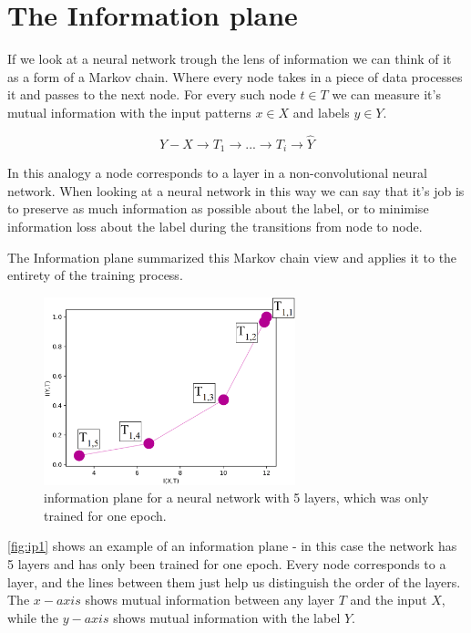 \documentclass[dissertation.tex]{subfiles}
\begin{document}
\section{The Information plane}

If we look at a neural network trough the lens of information we can think of it
as a form of a Markov chain. Where every node takes in a piece of data processes
it and passes to the next node. For every such node $ t \in T $ we can measure
it's mutual information with the input patterns $ x \in X $ and labels $ y \in Y
$. 

$$ Y - X \rightarrow T_1 \rightarrow ... \rightarrow T_i \rightarrow \hat{Y} $$

In this analogy a node corresponds to a layer in a non-convolutional neural
network. When looking at a neural network in this way we can say that it's job
is to preserve as much information as possible about the label, or to minimise
information loss about the label during the transitions from node to node.

The Information plane summarized this Markov chain view and applies it to the
entirety of the training process.

\begin{figure}[H]
  \centering
  \includegraphics[width=0.65\textwidth]{figs/ip_1v3.png}
  \caption{
    information plane for a neural network with 5 layers, which was only trained
    for one epoch.
  }
  \label{fig:ip1}
\end{figure}

\autoref{fig:ip1} shows an example of an information plane - in this case the
network has 5 layers and has only been trained for one epoch. Every node
corresponds to a layer, and the lines between them just help us distinguish the
order of the layers. The $ x-axis $ shows mutual information between any layer $
T $ and the input $ X $, while the $ y-axis $ shows mutual information with the
label $ Y $.
\end{document}

